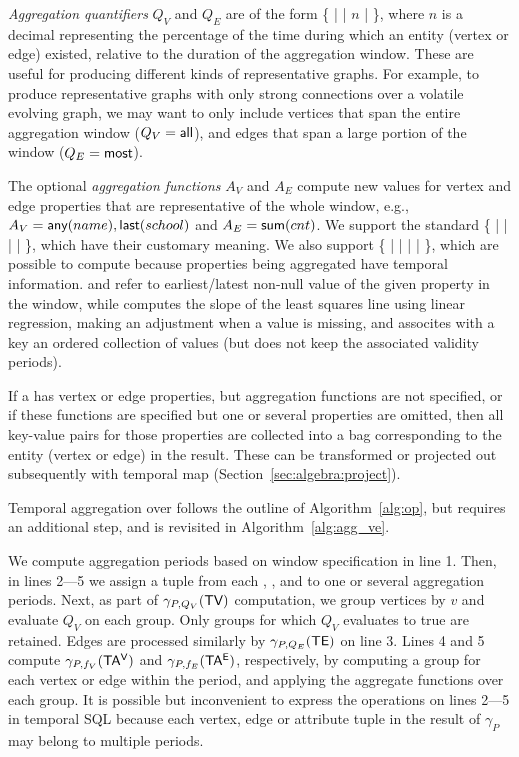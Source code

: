 {\em Aggregation quantifiers} $Q_V$ and $Q_E$ are of the form \{
 |  |  $n$ |  \},
where $n$ is a decimal representing the percentage of the time during
which an entity (vertex or edge) existed, relative to the duration of
the aggregation window. These are useful for producing different kinds
of representative graphs.  For example, to produce representative
graphs with only strong connections over a volatile evolving graph, we
may want to only include vertices that span the entire aggregation
window ($Q_V=\textsf{all}$), and edges that span a large portion of the
window ($Q_E=\textsf{most}$).
 
The optional {\em aggregation functions} $A_V$ and $A_E$ compute new
values for vertex and edge properties that are representative of the
whole window, e.g., $A_V=\textsf{any}(name), \textsf{last}(school)$ and
$A_E=\textsf{sum}(cnt)$.
%
We support the standard \{  |  |  |
 |  \}, which have their customary meaning.
We also support \{  |  |  |
 |  \}, which are possible to compute because
properties being aggregated have temporal information.  
and  refer to earliest/latest non-null value of the given
property in the window, while  computes the slope of the
least squares line using linear regression, making an adjustment when
a value is missing, and  assocites with a key an ordered
collection of values (but does not keep the associated validity
periods).
 
If a \tg has vertex or edge properties, but aggregation functions are
not specified, or if these functions are specified but one or several
properties are omitted, then all key-value pairs for those properties
are collected into a bag corresponding to the entity (vertex or edge)
in the result.  These can be transformed or projected out subsequently
with temporal map (Section~\ref{sec:algebra:project}).
 
Temporal aggregation over \tve follows the outline of
Algorithm~\ref{alg:op}, but requires an additional step, and is
revisited in Algorithm~\ref{alg:agg_ve}.

We compute aggregation periods based on window specification in line
1.  Then, in lines 2---5 we assign a tuple from each \tv, \te, \tav
and \tae to one or several aggregation periods.  Next, as part of
$\gamma_{P,Q_V}(\textsf{TV})$ computation, we group vertices by $v$ and
evaluate $Q_V$ on each group.  Only groups for which $Q_V$ evaluates
to true are retained.  Edges are processed similarly by
$\gamma_{P,Q_E}(\textsf{TE})$ on line 3.  Lines 4 and 5 compute
$\gamma_{P,f_V}(\mathsf{TA^{V}})$ and $\gamma_{P,f_E}(\mathsf{TA^{E}})$, respectively, by
computing a group for each vertex or edge within the period, and
applying the aggregate functions over each group.  It is possible but
inconvenient to express the operations on lines 2---5 in temporal SQL
because each vertex, edge or attribute tuple in the result of
$\gamma_{P}$ may belong to multiple periods.

